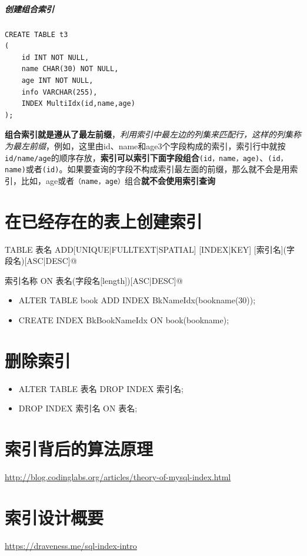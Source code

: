 \documentclass[UTF8,a4paper,12pt]{ctexbook}
\begin{document}
		\subparagraph{创建组合索引}
			\begin{lstlisting}
CREATE TABLE t3
(
	id INT NOT NULL,
	name CHAR(30) NOT NULL,
	age INT NOT NULL,
	info VARCHAR(255),
	INDEX MultiIdx(id,name,age)
);
			\end{lstlisting}
			
			\textbf{组合索引就是遵从了最左前缀}，\textit{利用索引中最左边的列集来匹配行，这样的列集称为最左前缀}，例如，这里由id、name和age3个字段构成的索引，索引行中就按\verb|id/name/age|的顺序存放，\textbf{索引可以索引下面字段组合}\verb|(id，name，age)|、\verb|(id，name)|或者\verb|(id)|。如果要查询的字段不构成索引最左面的前缀，那么就不会是用索引，比如，age或者\verb|（name，age）|组合\textbf{就不会使用索引查询}
			
	
	\section{在已经存在的表上创建索引}
	
		\verb@ALTER TABLE 表名 ADD[UNIQUE|FULLTEXT|SPATIAL] [INDEX|KEY] [索引名](字段名)[ASC|DESC]@
		
		 索引名称 ON 表名(字段名[length])[ASC|DESC]@
		
		\begin{itemize}
			\item ALTER TABLE book ADD INDEX BkNameIdx(bookname(30));
			\item CREATE INDEX BkBookNameIdx ON book(bookname);
		\end{itemize}
	
	\section{删除索引}
		\begin{itemize}
			\item ALTER TABLE 表名 DROP INDEX 索引名;
			\item DROP INDEX 索引名 ON 表名;
		\end{itemize}
	
	\section{索引背后的算法原理}
		\url{http://blog.codinglabs.org/articles/theory-of-mysql-index.html}	
	
	
	\section{索引设计概要}
		\url{https://draveness.me/sql-index-intro}
			
\end{document}
